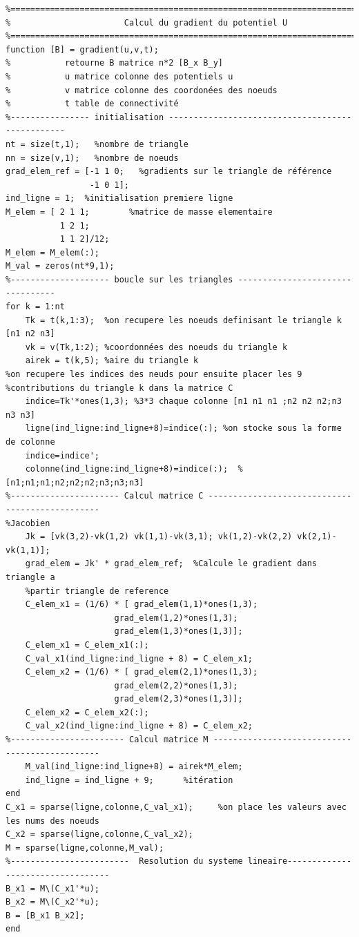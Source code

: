 \documentclass[a4paper,12pt,titlepage]{report}
\begin{document}
\begin{onehalfspace}
\begin{appendix}
\begin{verbatim}
%=========================================================================
%                       Calcul du gradient du potentiel U
%=========================================================================
function [B] = gradient(u,v,t);
%           retourne B matrice n*2 [B_x B_y]
%           u matrice colonne des potentiels u
%           v matrice colonne des coordonées des noeuds
%           t table de connectivité
%---------------- initialisation -------------------------------------------------
nt = size(t,1);   %nombre de triangle
nn = size(v,1);   %nombre de noeuds
grad_elem_ref = [-1 1 0;   %gradients sur le triangle de référence
                 -1 0 1];
ind_ligne = 1;  %initialisation premiere ligne
M_elem = [ 2 1 1;        %matrice de masse elementaire
	       1 2 1;
	       1 1 2]/12;
M_elem = M_elem(:);
M_val = zeros(nt*9,1);
%-------------------- boucle sur les triangles ---------------------------------
for k = 1:nt
	Tk = t(k,1:3);  %on recupere les noeuds definisant le triangle k  [n1 n2 n3]
    vk = v(Tk,1:2); %coordonnées des noeuds du triangle k   
    airek = t(k,5); %aire du triangle k
%on recupere les indices des neuds pour ensuite placer les 9
%contributions du triangle k dans la matrice C
    indice=Tk'*ones(1,3); %3*3 chaque colonne [n1 n1 n1 ;n2 n2 n2;n3 n3 n3] 
    ligne(ind_ligne:ind_ligne+8)=indice(:); %on stocke sous la forme de colonne
    indice=indice';                                 
    colonne(ind_ligne:ind_ligne+8)=indice(:);  %[n1;n1;n1;n2;n2;n2;n3;n3;n3]
%---------------------- Calcul matrice C ------------------------------------------------
%Jacobien
	Jk = [vk(3,2)-vk(1,2) vk(1,1)-vk(3,1); vk(1,2)-vk(2,2) vk(2,1)-vk(1,1)];
	grad_elem = Jk' * grad_elem_ref;  %Calcule le gradient dans triangle a 
	%partir triangle de reference
	C_elem_x1 = (1/6) * [ grad_elem(1,1)*ones(1,3);
                      grad_elem(1,2)*ones(1,3);
                      grad_elem(1,3)*ones(1,3)];
	C_elem_x1 = C_elem_x1(:);
	C_val_x1(ind_ligne:ind_ligne + 8) = C_elem_x1;
	C_elem_x2 = (1/6) * [ grad_elem(2,1)*ones(1,3);
                      grad_elem(2,2)*ones(1,3);
                      grad_elem(2,3)*ones(1,3)];
	C_elem_x2 = C_elem_x2(:);
	C_val_x2(ind_ligne:ind_ligne + 8) = C_elem_x2;
%----------------------- Calcul matrice M -----------------------------------------------
	M_val(ind_ligne:ind_ligne+8) = airek*M_elem;
	ind_ligne = ind_ligne + 9;      %itération
end
C_x1 = sparse(ligne,colonne,C_val_x1);     %on place les valeurs avec les nums des noeuds
C_x2 = sparse(ligne,colonne,C_val_x2);
M = sparse(ligne,colonne,M_val);
%------------------------  Resolution du systeme lineaire----------------------------------
B_x1 = M\(C_x1'*u);
B_x2 = M\(C_x2'*u);
B = [B_x1 B_x2];
end
\end{verbatim}


\end{appendix}
\end{onehalfspace}
\end{document}
